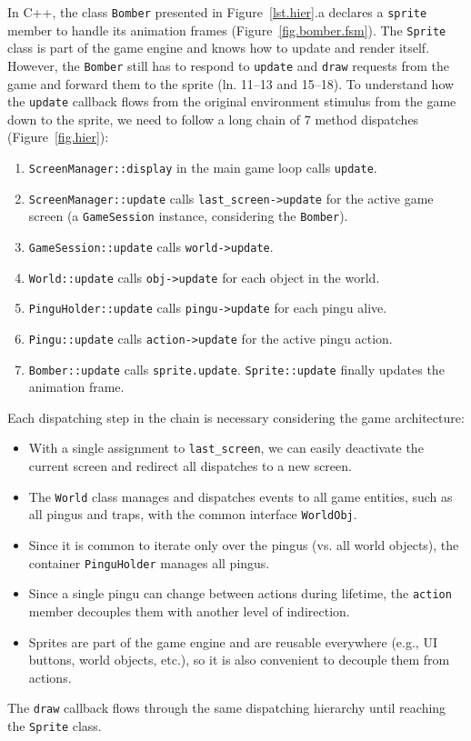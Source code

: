 \documentclass{vgtc}                          %
\newcommand{\code}[1] {{\small{\texttt{#1}}}}
\begin{document}
In C++, the class \code{Bomber} presented in Figure~\ref{lst.hier}.a declares a
\code{sprite} member to handle its animation frames
(Figure~\ref{fig.bomber.fsm}).
%
The \code{Sprite} class is part of the game engine and knows how to update and
render itself.
However, the \code{Bomber} still has to respond to \code{update} and
\code{draw} requests from the game and forward them to the sprite
(ln. 11--13 and 15--18).
%
To understand how the \code{update} callback flows from the original
environment stimulus from the game down to the sprite, we need to follow a long
chain of 7 method dispatches (Figure~\ref{fig.hier}):
%
\begin{enumerate}
\item \code{ScreenManager::display} in the main game loop calls \code{update}.
\item \code{ScreenManager::update} calls \code{last\_screen->update} for the
      active game screen (a \code{GameSession} instance, considering the
      \code{Bomber}).
\item \code{GameSession::update} calls \code{world->update}.
\item \code{World::update} calls \code{obj->update} for each object in the
      world.
\item \code{PinguHolder::update} calls \code{pingu->update} for each pingu
      alive.
\item \code{Pingu::update} calls \code{action->update} for the active pingu
      action.
\item \code{Bomber::update} calls \code{sprite.update}.
      \code{Sprite::update} finally updates the animation frame.
\end{enumerate}
%
Each dispatching step in the chain is necessary considering the game
architecture:
%
\begin{itemize}
\item With a single assignment to \code{last\_screen}, we can easily deactivate
      the current screen and redirect all dispatches to a new screen.
\item The \code{World} class manages and dispatches events to all game
      entities, such as all pingus and traps, with the common interface
      \code{WorldObj}.
\item Since it is common to iterate only over the pingus (vs. all world
      objects), the container \code{PinguHolder} manages all pingus.
\item Since a single pingu can change between actions during lifetime, the
      \code{action} member decouples them with another level of indirection.
\item Sprites are part of the game engine and are reusable everywhere (e.g., UI
      buttons, world objects, etc.), so it is also convenient to decouple them
      from actions.
\end{itemize}
%
The \code{draw} callback flows through the same dispatching hierarchy until
reaching the \code{Sprite} class.
\end{document}
